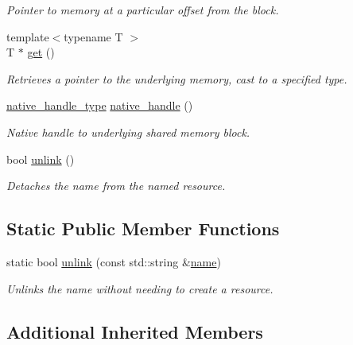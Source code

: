 \begin{DoxyCompactItemize}
\begin{DoxyCompactList}\small\item\em Pointer to memory at a particular offset from the block. \end{DoxyCompactList}\item 
{\footnotesize template$<$typename T $>$ }\\T $\ast$ \hyperlink{classcpen333_1_1process_1_1windows_1_1shared__memory_a3986cdc917b26ab1ab608f59270a47c5}{get} ()
\begin{DoxyCompactList}\small\item\em Retrieves a pointer to the underlying memory, cast to a specified type. \end{DoxyCompactList}\item 
\hyperlink{classcpen333_1_1process_1_1windows_1_1shared__memory_a92d977097375f7b87d5702b7da666267}{native\+\_\+handle\+\_\+type} \hyperlink{classcpen333_1_1process_1_1windows_1_1shared__memory_a1827dd03341d7c6afcc02cf078f54e32}{native\+\_\+handle} ()
\begin{DoxyCompactList}\small\item\em Native handle to underlying shared memory block. \end{DoxyCompactList}\item 
bool \hyperlink{classcpen333_1_1process_1_1windows_1_1shared__memory_aa6efdc9a3e1310ea69ecc48aeb41286c}{unlink} ()
\begin{DoxyCompactList}\small\item\em Detaches the name from the named resource. \end{DoxyCompactList}\end{DoxyCompactItemize}
\subsection*{Static Public Member Functions}
\begin{DoxyCompactItemize}
\item 
static bool \hyperlink{classcpen333_1_1process_1_1windows_1_1shared__memory_a99c4766a9995a97595bba1550256f1c9}{unlink} (const std\+::string \&\hyperlink{classcpen333_1_1process_1_1impl_1_1named__resource__base_ae0c5fbb1843afe863cece4b51c38f807}{name})
\begin{DoxyCompactList}\small\item\em Unlinks the name without needing to create a resource. \end{DoxyCompactList}\end{DoxyCompactItemize}
\subsection*{Additional Inherited Members}


